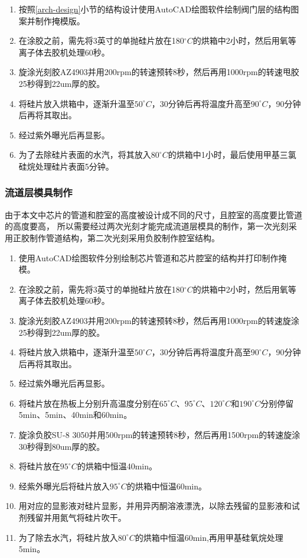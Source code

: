 	\begin{enumerate}[label={\alph*)},font={\color{black!50!black}\bfseries}]
	\item 按照\ref{arch-design}小节的结构设计使用AutoCAD绘图软件绘制阀门层的结构图案并制作掩模版。
	\item 在涂胶之前，需先将3英寸的单抛硅片放在180$^\circ C$的烘箱中2小时，然后用氧等离子体去胶机处理60秒。
	\item 旋涂光刻胶AZ4903并用200rpm的转速预转8秒，然后再用1000rpm的转速甩胶25秒得到22um厚的胶。
	\item 将硅片放入烘箱中，逐渐升温至$50^\circ C$，30分钟后再将温度升高至$90^\circ C$，90分钟后再将其取出。
	\item 经过紫外曝光后再显影。
	\item 为了去除硅片表面的水汽，将其放入$80^\circ C$的烘箱中1小时，最后使用甲基三氯硅烷处理硅片表面5分钟。
	\end{enumerate}
	
\subsubsection{流道层模具制作}
	由于本文中芯片的管道和腔室的高度被设计成不同的尺寸，且腔室的高度要比管道的高度要高，
	所以需要经过两次光刻才能完成流道层模具的制作，第一次光刻采用正胶制作管道结构，第二次光刻采用负胶制作腔室结构。
	\begin{enumerate}[label={\alph*)},font={\color{black!50!black}\bfseries}]
	\item 使用AutoCAD绘图软件分别绘制芯片管道和芯片腔室的结构并打印制作掩模。
	\item 在涂胶之前，需先将3英寸的单抛硅片放在180$^\circ C$的烘箱中2小时，然后用氧等离子体去胶机处理60秒。
	\item 旋涂光刻胶AZ4903并用200rpm的转速预转8秒，然后再用1000rpm的转速旋涂25秒得到22um厚的胶。
	\item 将硅片放入烘箱中，逐渐升温至$50^\circ C$，30分钟后再将温度升高至$90^\circ C$，90分钟后再将其取出。
	\item 经过紫外曝光后再显影。
	\item 将硅片放在热板上分别升高温度分别在$65^\circ C$、$95^\circ C$、$120^\circ C$和$190^\circ C$分别停留
	5min、5min、40min和60min。
	\item 旋涂负胶SU-8 3050并用500rpm的转速预转8秒，然后再用1500rpm的转速旋涂30秒得到80um厚的胶。
	\item 将硅片放在$95^\circ C$的烘箱中恒温40min。
	\item 经紫外曝光后将硅片放入$95^\circ C$的烘箱中恒温60min。
	\item 用对应的显影液对硅片显影，并用异丙酮溶液漂洗，以除去残留的显影液和试剂残留并用氮气将硅片吹干。
	\item 为了除去水汽，将硅片放入$80^\circ C$的烘箱中恒温60min,再用甲基硅氧烷处理5min。
	\end{enumerate}

